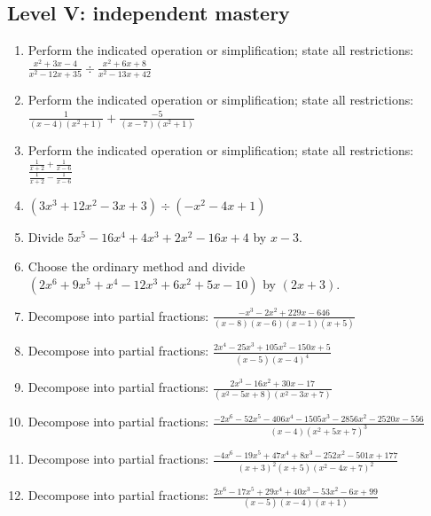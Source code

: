 \documentclass[11pt,oneside]{book}
\begin{document}
\subsection*{Level V: independent mastery}
\begin{enumerate}[leftmargin=*,label=\textbf{\arabic*.},itemsep=0.65\baselineskip]
\item Perform the indicated operation or simplification; state all restrictions: $\displaystyle \frac{x^{2} + 3 x - 4}{x^{2} - 12 x + 35}\div\frac{x^{2} + 6 x + 8}{x^{2} - 13 x + 42}$
\item Perform the indicated operation or simplification; state all restrictions: $\displaystyle \frac{1}{\left(x - 4\right) \left(x^{2} + 1\right)}+\frac{-5}{\left(x - 7\right) \left(x^{2} + 1\right)}$
\item Perform the indicated operation or simplification; state all restrictions: $\displaystyle \frac{\frac{1}{x + 2} + \frac{1}{x - 6}}{\frac{1}{x + 2} - \frac{1}{x - 6}}$
\item $\displaystyle (3 x^{3} + 12 x^{2} - 3 x + 3)\div(- x^{2} - 4 x + 1)$
\item Divide $ 5 x^{5} - 16 x^{4} + 4 x^{3} + 2 x^{2} - 16 x + 4 $ by $x - 3$.
\item Choose the ordinary method and divide $(2 x^{6} + 9 x^{5} + x^{4} - 12 x^{3} + 6 x^{2} + 5 x - 10)$ by $(2 x + 3)$.
\item Decompose into partial fractions: $\displaystyle \frac{- x^{3} - 2 x^{2} + 229 x - 646}{\left(x - 8\right) \left(x - 6\right) \left(x - 1\right) \left(x + 5\right)}$
\item Decompose into partial fractions: $\displaystyle \frac{2 x^{4} - 25 x^{3} + 105 x^{2} - 150 x + 5}{\left(x - 5\right) \left(x - 4\right)^{4}}$
\item Decompose into partial fractions: $\displaystyle \frac{2 x^{3} - 16 x^{2} + 30 x - 17}{\left(x^{2} - 5 x + 8\right) \left(x^{2} - 3 x + 7\right)}$
\item Decompose into partial fractions: $\displaystyle \frac{- 2 x^{6} - 52 x^{5} - 406 x^{4} - 1505 x^{3} - 2856 x^{2} - 2520 x - 556}{\left(x - 4\right) \left(x^{2} + 5 x + 7\right)^{3}}$
\item Decompose into partial fractions: $\displaystyle \frac{- 4 x^{6} - 19 x^{5} + 47 x^{4} + 8 x^{3} - 252 x^{2} - 501 x + 177}{\left(x + 3\right)^{2} \left(x + 5\right) \left(x^{2} - 4 x + 7\right)^{2}}$
\item Decompose into partial fractions: $\displaystyle \frac{2 x^{6} - 17 x^{5} + 29 x^{4} + 40 x^{3} - 53 x^{2} - 6 x + 99}{\left(x - 5\right) \left(x - 4\right) \left(x + 1\right)}$

\end{enumerate}
\end{document}
